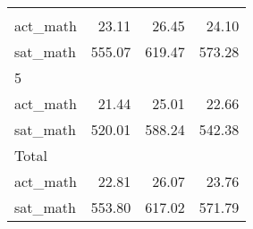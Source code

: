 \begin{table}[!h]
\begin{tabular}{llll}
  \multicolumn{1}{r}{} \\
\multicolumn{1}{l}{\hspace{2em}act\_math} &
  \multicolumn{1}{|r}{23.11} &
  \multicolumn{1}{r}{26.45} &
  \multicolumn{1}{r}{24.10} \\
\multicolumn{1}{l}{\hspace{2em}sat\_math} &
  \multicolumn{1}{|r}{555.07} &
  \multicolumn{1}{r}{619.47} &
  \multicolumn{1}{r}{573.28} \\
\multicolumn{1}{l}{\hspace{1em}5} &
  \multicolumn{1}{|r}{} &
  \multicolumn{1}{r}{} &
  \multicolumn{1}{r}{} \\
\multicolumn{1}{l}{\hspace{2em}act\_math} &
  \multicolumn{1}{|r}{21.44} &
  \multicolumn{1}{r}{25.01} &
  \multicolumn{1}{r}{22.66} \\
\multicolumn{1}{l}{\hspace{2em}sat\_math} &
  \multicolumn{1}{|r}{520.01} &
  \multicolumn{1}{r}{588.24} &
  \multicolumn{1}{r}{542.38} \\
\multicolumn{1}{l}{\hspace{1em}Total} &
  \multicolumn{1}{|r}{} &
  \multicolumn{1}{r}{} &
  \multicolumn{1}{r}{} \\
\multicolumn{1}{l}{\hspace{2em}act\_math} &
  \multicolumn{1}{|r}{22.81} &
  \multicolumn{1}{r}{26.07} &
  \multicolumn{1}{r}{23.76} \\
\multicolumn{1}{l}{\hspace{2em}sat\_math} &
  \multicolumn{1}{|r}{553.80} &
  \multicolumn{1}{r}{617.02} &
  \multicolumn{1}{r}{571.79} \\
\cline{1-4}
\end{tabular}
\end{table}
